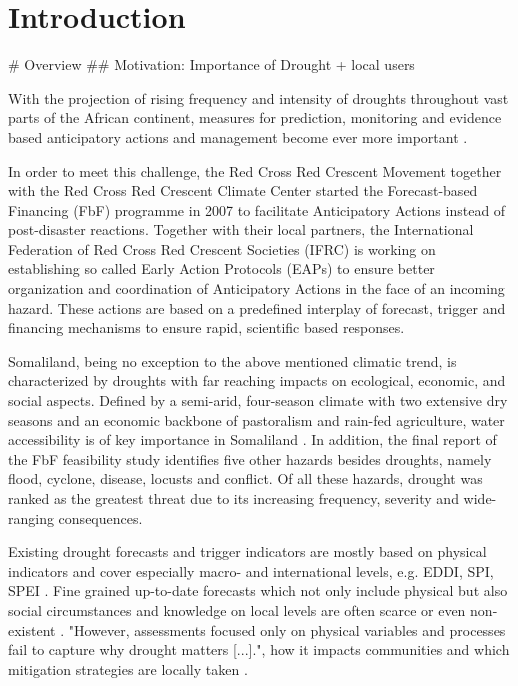 
\section{Introduction}
\# Overview
\#\# Motivation: Importance of Drought + local users

With the projection of rising frequency and intensity of droughts throughout vast parts of the African continent, measures for prediction, monitoring and evidence based anticipatory actions and management become ever more important \autocite{abdulkadirAssessmentDroughtRecurrence2017,adelekanAfricaClimateChange2022,vereintenationenSpecialReportDrought2021}.

In order to meet this challenge, the Red Cross Red Crescent Movement together with the Red Cross Red Crescent Climate Center started the Forecast-based Financing (FbF) programme in 2007 to facilitate Anticipatory Actions instead of post-disaster reactions. Together with their local partners, the International Federation of Red Cross Red Crescent Societies (IFRC) is working on establishing so called Early Action Protocols (EAPs) to ensure better organization and coordination of Anticipatory Actions in the face of an incoming hazard. These actions are based on a predefined interplay of forecast, trigger and financing mechanisms to ensure rapid, scientific based responses.

Somaliland, being no exception to the above mentioned climatic trend, is characterized by droughts with far reaching impacts on ecological, economic, and social aspects. Defined by a semi-arid, four-season climate with two extensive dry seasons and an economic backbone of pastoralism and rain-fed agriculture, water accessibility is of key importance in Somaliland \autocite{abdulkadirAssessmentDroughtRecurrence2017,petrucciLandscapeLandformsNorthern2022,republicofsomalilandSomalilandCountryProfile2021}.
In addition, the final report of the FbF feasibility study identifies five other hazards besides droughts, namely flood, cyclone, disease, locusts and conflict. Of all these hazards, drought was ranked as the greatest threat due to its increasing frequency, severity and wide-ranging consequences.\newline

Existing drought forecasts and trigger indicators are mostly based on physical indicators and cover especially macro- and international levels, e.g. EDDI, SPI, SPEI . Fine grained up-to-date forecasts which not only include physical but also social circumstances and knowledge on local levels are often scarce or even non-existent . "However, assessments focused only on physical variables and processes fail to capture why drought matters [...]."\autocite[3]{lackstromBackyardHydroclimatologyCitizen2022}, how it impacts communities and which mitigation strategies are locally taken .\newline

